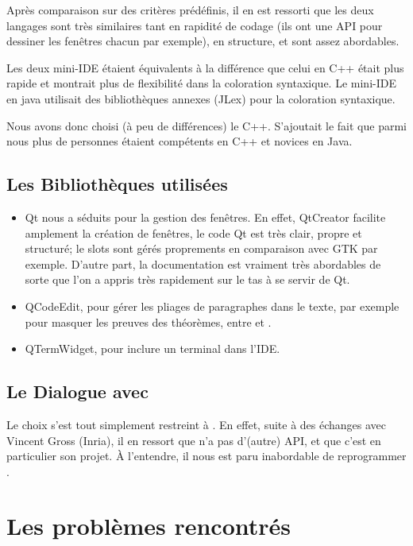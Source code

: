 Après comparaison sur des critères prédéfinis, il en est ressorti que les deux langages sont très similaires tant en rapidité de codage (ils ont une API pour dessiner les fenêtres chacun par exemple), en structure, et sont assez abordables.

Les deux mini-IDE étaient équivalents à la différence que celui en C++ était plus rapide et montrait plus de flexibilité dans la coloration syntaxique. Le mini-IDE en java utilisait des bibliothèques annexes (JLex) pour la coloration syntaxique.
    
Nous avons donc choisi (à peu de différences) le C++. S'ajoutait le fait que parmi nous plus de personnes étaient compétents en C++ et novices en Java.

\subsection{Les Bibliothèques utilisées}

\begin{itemize} 
  \item Qt nous a séduits pour la gestion des fenêtres.
    En effet, QtCreator facilite amplement la création de fenêtres, le code Qt est très clair, propre et structuré; le slots sont gérés proprements en comparaison avec GTK par exemple.
    D'autre part, la documentation est vraiment très abordables de sorte que l'on a appris très rapidement sur le tas à se servir de Qt.
    
  \item QCodeEdit, pour gérer les pliages de paragraphes dans le texte, par exemple pour masquer les preuves des théorèmes, entre  et .
  
  \item QTermWidget, pour inclure un terminal dans l'IDE.  
\end{itemize}

\subsection{Le Dialogue avec \Coq{}}
    
Le choix s'est tout simplement restreint à \coqtop{}. 
En effet, suite à des échanges avec Vincent Gross (Inria), il en ressort que \Coq{} n'a pas d'(autre) API, et que c'est en particulier son projet. À l'entendre, il nous est paru inabordable de reprogrammer \coqtop{}. 
        
\section{Les problèmes rencontrés}

